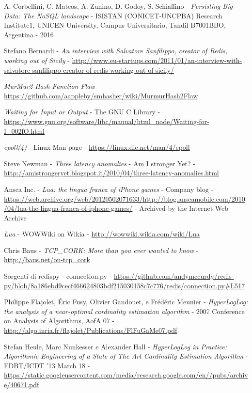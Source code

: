 \begin{thebibliography}{99}

	A. Corbellini, C. Mateos, A. Zunino, D. Godoy, S. Schiaffino - 
	\emph{Persisting Big Data: The NoSQL landscape} - 
	ISISTAN (CONICET-UNCPBA) Research Institute1, UNICEN University, Campus Universitario, Tandil B7001BBO, Argentina - 
	2016

	Stefano Bernardi - 
	\emph{An interview with Salvatore Sanfilippo, creator of Redis, working out of Sicily} - 
	\url{http://www.eu-startups.com/2011/01/an-interview-with-salvatore-sanfilippo-creator-of-redis-working-out-of-sicily/}

	\emph{MurMur2 Hash Function Flaw} -
	\url{https://github.com/aappleby/smhasher/wiki/MurmurHash2Flaw}

	\emph{Waiting for Input or Output} - 
	The GNU C Library - 
	\url{https://www.gnu.org/software/libc/manual/html_node/Waiting-for-I_002fO.html}

	\emph{epoll(4)} - 
	Linux Man page - 
	\url{https://linux.die.net/man/4/epoll}

	Steve Newman -
	\emph{Three latency anomalies} - 
	Am I stronger Yet? - 
	\url{http://amistrongeryet.blogspot.it/2010/04/three-latency-anomalies.html}

	Ansca Inc. -
	\emph{Lua: the lingua franca of iPhone games} -
	Company blog -
	\url{https://web.archive.org/web/20120502071633/http://blog.anscamobile.com/2010/04/lua-the-lingua-franca-of-iphone-games/} -
	Archived by the Internet Web Archive

	\emph{Lua} -
	WOWWiki on Wikia -
	\url{http://wowwiki.wikia.com/wiki/Lua}

	Chris Baus -
	\emph{TCP\_CORK: More than you ever wanted to know} -
	\url{http://baus.net/on-tcp_cork}

	Sorgenti di redispy - connection.py -
	\url{https://github.com/andymccurdy/redis-py/blob/8a186ebd9cecf466624803bdf215030158c7c776/redis/connection.py\#L517}

	Philippe Flajolet, Éric Fusy, Olivier Gandouet, e Frédéric Meunier -
	\emph{HyperLogLog: the analysis of a near-optimal cardinality estimation algorithm} -
	2007 Conference on Analysis of Algorithms, AofA 07 -
	\url{http://algo.inria.fr/flajolet/Publications/FlFuGaMe07.pdf}

	Stefan Heule, Marc Nunkesser e Alexander Hall -
	\emph{HyperLogLog in Practice: Algorithmic Engineering of a State of The Art Cardinality Estimation Algorithm} -
	EDBT/ICDT ’13 March 18 - 
	\url{https://static.googleusercontent.com/media/research.google.com/en//pubs/archive/40671.pdf}


\end{thebibliography}
